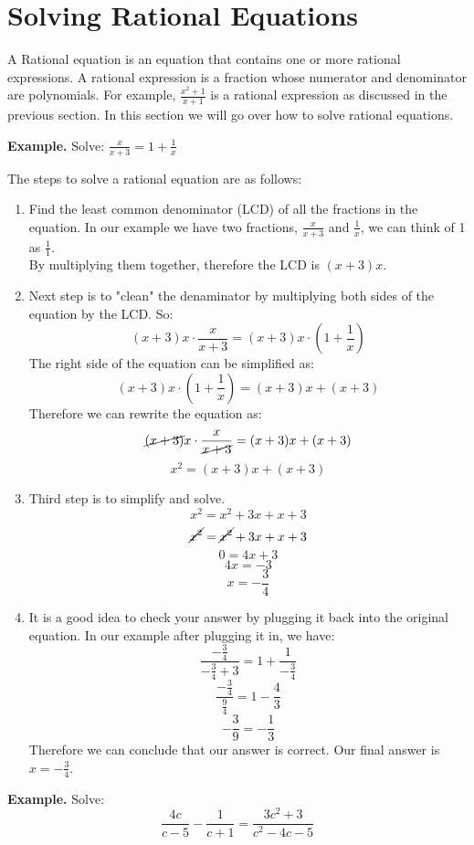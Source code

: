 \section{Solving Rational Equations}
A Rational equation is an equation that contains one or more rational expressions. A rational expression is a fraction whose numerator and denominator are polynomials. For example, $\frac{x^2+1}{x+1}$ is a rational expression as discussed in the previous section. In this section we will go over how to solve rational equations.

\textbf{Example.} Solve: $\frac{x}{x+3} = 1+\frac{1}{x}$

The steps to solve a rational equation are as follows:
\begin{enumerate}
    \item Find the least common denominator (LCD) of all the fractions in the equation. In our example we have two fractions, $\frac{x}{x+3}$ and $\frac{1}{x}$, we can think of 1 as $\frac{1}{1}$. \\
    By multiplying them together, therefore the LCD is $(x+3)x$.
    \item Next step is to "clean" the denaminator  by multiplying both sides of the equation by the LCD. So:
    $$ (x+3)x \cdot \frac{x}{x+3} = (x+3)x \cdot \left(1+\frac{1}{x}\right)$$
    The right side of the equation can be simplified as:
    $$ (x+3)x \cdot \left(1+\frac{1}{x}\right) = (x+3)x + (x+3)$$
    Therefore we can rewrite the equation as:
    $$ \cancel{(x+3)}x \cdot \frac{x}{\cancel{x+3}} =  (x+3)x + (x+3)$$
    $$ x^2 =  (x+3)x + (x+3)$$
    \item Third step is to simplify and solve. 
    $$ x^2 =  x^2+3x+x+3$$
    $$ \cancel{x^2} =  \cancel{x^2}+3x+x+3$$
    $$0 =  4x+3$$
    $$4x =  -3$$
    $$x =  -\frac{3}{4}$$
    \item It is a good idea to check your answer by plugging it back into the original equation. In our example after plugging it in, we have:
    $$ \frac{-\frac{3}{4}}{-\frac{3}{4}+3} = 1+\frac{1}{-\frac{3}{4}}$$
    $$ \frac{-\frac{3}{4}}{\frac{9}{4}} = 1-\frac{4}{3}$$
    $$ -\frac{3}{9} = -\frac{1}{3} $$
    Therefore we can conclude that our answer is correct. Our final answer is $x = -\frac{3}{4}$.
\end{enumerate}


\textbf{Example.} Solve: 
\begin{equation*}
    \frac{4c}{c-5} - \frac{1}{c+1} = \frac{3c^2+3}{c^2-4c-5}
\end{equation*}

